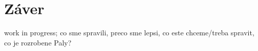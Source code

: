 \section{Záver}
work in progress; co sme spravili, preco sme lepsi, co este chceme/treba spravit, co je rozrobene
Paly?